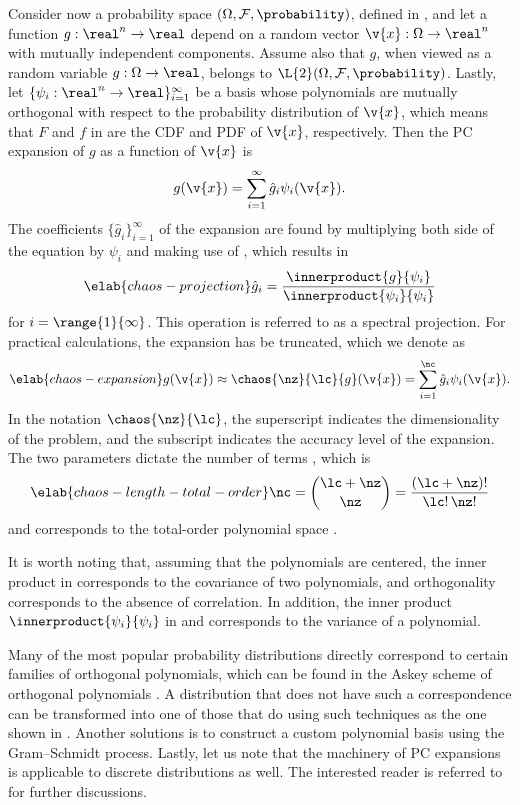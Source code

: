 Consider now a probability space $(\Omega, \mathcal{F}, \probability)$, defined
in , and let a function $g: \real^n \to \real$ depend
on a random vector $\v{x}: \Omega \to \real^n$ with mutually independent
components. Assume also that $g$, when viewed as a random variable $g: \Omega
\to \real$, belongs to $\L{2}(\Omega, \mathcal{F}, \probability)$. Lastly, let
$\{ \psi_i: \real^n \to \real \}_{i = 1}^\infty$ be a basis whose polynomials
are mutually orthogonal with respect to the probability distribution of $\v{x}$,
which means that $F$ and $f$ in  are the \ac{CDF}
and \ac{PDF} of $\v{x}$, respectively. Then the \ac{PC} expansion of $g$ as a
function of $\v{x}$ is
\[
  g(\v{x}) = \sum_{i = 1}^\infty \hat{g}_i \psi_i(\v{x}).
\]
The coefficients $\{ \hat{g}_i \}_{i = 1}^\infty$ of the expansion are found by
multiplying both side of the equation by $\psi_i$ and making use of
, which results in
\begin{equation} \elab{chaos-projection}
  \hat{g}_i = \frac{\innerproduct{g}{\psi_i}}{\innerproduct{\psi_i}{\psi_i}}
\end{equation}
for $i = \range{1}{\infty}$. This operation is referred to as a spectral
projection. For practical calculations, the expansion has be truncated, which we
denote as
\begin{equation} \elab{chaos-expansion}
  g(\v{x}) \approx \chaos{\nz}{\lc}{g}(\v{x}) = \sum_{i = 1}^\nc \hat{g}_i \psi_i(\v{x}).
\end{equation}
In the notation $\chaos{\nz}{\lc}$, the superscript \nz indicates the
dimensionality of the problem, and the subscript \lc indicates the accuracy
level of the expansion. The two parameters dictate the number of terms \nc,
which is
\begin{equation} \elab{chaos-length-total-order}
  \nc = { \lc + \nz \choose \nz } = \frac{(\lc + \nz)!}{\lc! \, \nz!}
\end{equation}
and corresponds to the total-order polynomial space \cite{eldred2008, beck2011}.

It is worth noting that, assuming that the polynomials are centered, the inner
product in  corresponds to the covariance of two
polynomials, and orthogonality corresponds to the absence of correlation. In
addition, the inner product $\innerproduct{\psi_i}{\psi_i}$ in
 and  corresponds to the
variance of a polynomial.

Many of the most popular probability distributions directly correspond to
certain families of orthogonal polynomials, which can be found in the Askey
scheme of orthogonal polynomials \cite{xiu2010}. A distribution that does not
have such a correspondence can be transformed into one of those that do using
such techniques as the one shown in . Another
solutions is to construct a custom polynomial basis using the Gram--Schmidt
process. Lastly, let us note that the machinery of \ac{PC} expansions is
applicable to discrete distributions as well. The interested reader is referred
to \cite{xiu2010} for further discussions.
